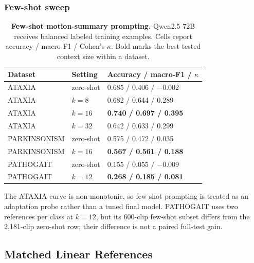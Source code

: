 \subsubsection{Few-shot sweep}

\begin{table}[H]
\centering
\caption{\textbf{Few-shot motion-summary prompting.} Qwen2.5-72B receives balanced labeled training examples. Cells report accuracy / macro-F1 / Cohen's $\kappa$. Bold marks the best tested context size within a dataset.}
\label{tab:fewshot_sweep}
\small
\begin{tabular}{lll}
\toprule
Dataset & Setting & Accuracy / macro-F1 / $\kappa$ \\
\midrule
ATAXIA & zero-shot & 0.685 / 0.406 / $-0.002$ \\
ATAXIA & $k=8$ & 0.682 / 0.644 / 0.289 \\
ATAXIA & $k=16$ & \textbf{0.740 / 0.697 / 0.395} \\
ATAXIA & $k=32$ & 0.642 / 0.633 / 0.299 \\
\addlinespace
PARKINSONISM & zero-shot & 0.575 / 0.472 / 0.035 \\
PARKINSONISM & $k=16$ & \textbf{0.567 / 0.561 / 0.188} \\
\addlinespace
PATHOGAIT & zero-shot & 0.155 / 0.055 / $-0.009$ \\
PATHOGAIT & $k=12$ & \textbf{0.268 / 0.185 / 0.081} \\
\bottomrule
\end{tabular}
\end{table}

The ATAXIA curve is non-monotonic, so few-shot prompting is treated as an adaptation probe rather than a tuned final model. PATHOGAIT uses two references per class at $k=12$, but its 600-clip few-shot subset differs from the 2,181-clip zero-shot row; their difference is not a paired full-test gain.

\subsection{Matched Linear References}
\label{sec:supp_references}

